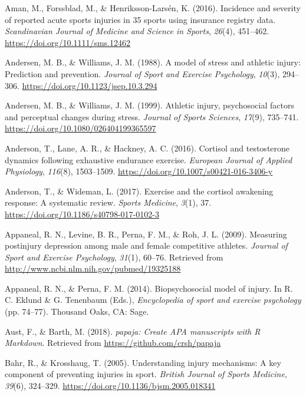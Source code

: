 \documentclass[
  english,
  man,floatsintext]{apa6}
\begin{document}
\leavevmode\hypertarget{ref-Aman2016}{}%
Aman, M., Forssblad, M., \& Henriksson-Larsén, K. (2016). Incidence and severity of reported acute sports injuries in 35 sports using insurance registry data. \emph{Scandinavian Journal of Medicine and Science in Sports}, \emph{26}(4), 451--462. \url{https://doi.org/10.1111/sms.12462}

\leavevmode\hypertarget{ref-Andersen1988}{}%
Andersen, M. B., \& Williams, J. M. (1988). A model of stress and athletic injury: Prediction and prevention. \emph{Journal of Sport and Exercise Psychology}, \emph{10}(3), 294--306. \url{https://doi.org/10.1123/jsep.10.3.294}

\leavevmode\hypertarget{ref-Andersen1999}{}%
Andersen, M. B., \& Williams, J. M. (1999). Athletic injury, psychosocial factors and perceptual changes during stress. \emph{Journal of Sports Sciences}, \emph{17}(9), 735--741. \url{https://doi.org/10.1080/026404199365597}

\leavevmode\hypertarget{ref-Anderson2016}{}%
Anderson, T., Lane, A. R., \& Hackney, A. C. (2016). Cortisol and testosterone dynamics following exhaustive endurance exercise. \emph{European Journal of Applied Physiology}, \emph{116}(8), 1503--1509. \url{https://doi.org/10.1007/s00421-016-3406-y}

\leavevmode\hypertarget{ref-Anderson2017}{}%
Anderson, T., \& Wideman, L. (2017). Exercise and the cortisol awakening response: A systematic review. \emph{Sports Medicine}, \emph{3}(1), 37. \url{https://doi.org/10.1186/s40798-017-0102-3}

\leavevmode\hypertarget{ref-Appaneal2009}{}%
Appaneal, R. N., Levine, B. R., Perna, F. M., \& Roh, J. L. (2009). Measuring postinjury depression among male and female competitive athletes. \emph{Journal of Sport and Exercise Psychology}, \emph{31}(1), 60--76. Retrieved from \url{http://www.ncbi.nlm.nih.gov/pubmed/19325188}

\leavevmode\hypertarget{ref-Appaneal2014}{}%
Appaneal, R. N., \& Perna, F. M. (2014). Biopsychosocial model of injury. In R. C. Eklund \& G. Tenenbaum (Eds.), \emph{Encyclopedia of sport and exercise psychology} (pp. 74--77). Thousand Oaks, CA: Sage.

\leavevmode\hypertarget{ref-R-papaja}{}%
Aust, F., \& Barth, M. (2018). \emph{papaja: Create APA manuscripts with R Markdown}. Retrieved from \url{https://github.com/crsh/papaja}

\leavevmode\hypertarget{ref-Bahr2005}{}%
Bahr, R., \& Krosshaug, T. (2005). Understanding injury mechanisms: A key component of preventing injuries in sport. \emph{British Journal of Sports Medicine}, \emph{39}(6), 324--329. \url{https://doi.org/10.1136/bjsm.2005.018341}
\end{document}
